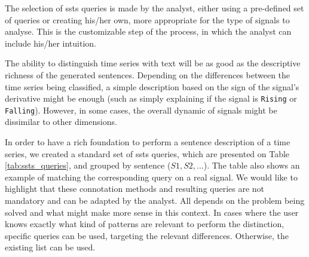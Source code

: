 The selection of \gls{ssts} queries is made by the analyst, either using a pre-defined set of queries or creating his/her own, more appropriate for the type of signals to analyse. This is the customizable step of the process, in which the analyst can include his/her intuition.

The ability to distinguish time series with text will be as good as the descriptive richness of the generated sentences. Depending on the differences between the time series being classified, a simple description based on the sign of the signal's derivative might be enough (such as simply explaining if the signal is \texttt{Rising} or \texttt{Falling}). However, in some cases, the overall dynamic of signals might be dissimilar to other dimensions. 

In order to have a rich foundation to perform a sentence description of a time series, we created a standard set of \gls{ssts} queries, which are presented on Table \ref{tab:ssts_queries}, and grouped by sentence ($S1, S2, ...$). The table also shows an example of matching the corresponding query on a real signal. We would like to highlight that these connotation methods and resulting queries are not mandatory and can be adapted by the analyst. All depends on the problem being solved and what might make more sense in this context. In cases where the user knows exactly what kind of patterns are relevant to perform the distinction, specific queries can be used, targeting the relevant differences. Otherwise, the existing list can be used.

